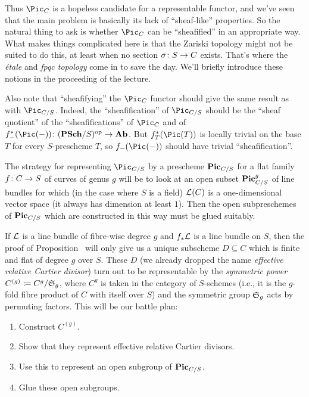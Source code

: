 \documentclass[a4paper,parskip=half,numbers=enddot, DIV=12]{scrreprt}
\begin{document}
Thus $\Pic_C$ is a hopeless candidate for a representable functor, and we've seen that the main problem is basically its lack of ``sheaf-like'' properties. So the natural thing to ask is whether $\Pic_C$ can be ``sheafified'' in an appropriate way. What makes things complicated here is that the Zariski topology might not be suited to do this, at least when no section $\sigma\colon S\morphism C$ exists. That's where the \emph{étale} and \emph{fpqc topology} come in to save the day. We'll briefly introduce these notions in the proceeding of the lecture.

Also note that ``sheafifying'' the $\Pic_C$ functor should give the same result as with $\Pic_{C/S}$. Indeed, the ``sheafification'' of $\Pic_{C/S}$ should be the ``sheaf quotient'' of the ``sheafifications'' of $\Pic_C$ and of $f_-^*(\Pic(-))\colon(\cat{PSch}/S)^\op\morphism\cat{Ab}$. But $f_T^*(\Pic(T))$ is locally trivial on the base $T$ for every $S$-prescheme $T$, so $f_-(\Pic(-))$ should have trivial ``sheafification''.

The strategy for representing $\Pic_{C/S}$ by a prescheme $\mathbf{Pic}_{C/S}$ for a flat family $f\colon C\morphism S$ of curves of genus $g$ will be to look at an open subset $\mathbf{Pic}_{C/S}^g$ of line bundles for which (in the case where $S$ is a field) $\mathcal{L}(C)$ is a one-dimensional vector space (it always has dimension at least $1$). Then the open subpreschemes of $\mathbf{Pic}_{C/S}$ which are constructed in this way must be glued suitably.

If $\mathcal{L}$ is a line bundle of fibre-wise degree $g$ and $f_*\mathcal{L}$ is a line bundle on $S$, then the proof of Proposition~ will only give us a unique subscheme $D\subseteq C$ which is finite and flat of degree $g$ over $S$. These $D$ (we already dropped the name \emph{effective relative Cartier divisor}) turn out to be representable by the \emph{symmetric power} $C^{(g)}\coloneqq C^{g}/\mathfrak{S}_g$, where $C^{g}$ is taken in the category of $S$-schemes (i.e., it is the $g$-fold fibre product of $C$ with itself over $S$) and the symmetric group $\mathfrak{S}_g$ acts by permuting factors. This will be our battle plan:
\begin{enumerate}
	\item Construct $C^{(g)}$.
	\item Show that they represent effective relative Cartier divisors.
	\item Use this to represent an open subgroup of $\mathbf{Pic}_{C/S}$.
	\item Glue these open subgroups.
\end{enumerate}
\end{document}
